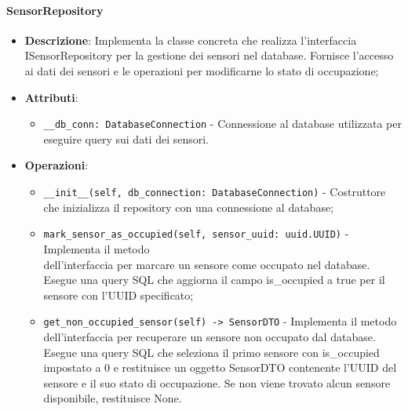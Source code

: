 \documentclass[10pt]{article}
\begin{document}
    \paragraph{SensorRepository}
    \begin{itemize} 
    \item \textbf{Descrizione}: Implementa la classe concreta che realizza l'interfaccia ISensorRepository per la gestione dei sensori nel database. Fornisce l'accesso ai dati dei sensori e le operazioni per modificarne lo stato di occupazione;
    \item \textbf{Attributi}:
    \begin{itemize}
        \item \texttt{\_\_db\_conn: DatabaseConnection} - Connessione al database utilizzata per eseguire query sui dati dei sensori.
    \end{itemize}
    
    \item \textbf{Operazioni}:
    \begin{itemize}
        \item \texttt{\_\_init\_\_(self, db\_connection: DatabaseConnection)} - Costruttore che inizializza il repository con una connessione al database;
        
        \item \texttt{mark\_sensor\_as\_occupied(self, sensor\_uuid: uuid.UUID)} - Implementa il metodo\\ dell'interfaccia per marcare un sensore come occupato nel database. Esegue una query SQL che aggiorna il campo is\_occupied a true per il sensore con l'UUID specificato;
        
        \item \texttt{get\_non\_occupied\_sensor(self) -> SensorDTO} - Implementa il metodo dell'interfaccia per recuperare un sensore non occupato dal database. Esegue una query SQL che seleziona il primo sensore con is\_occupied impostato a 0 e restituisce un oggetto SensorDTO contenente l'UUID del sensore e il suo stato di occupazione. Se non viene trovato alcun sensore disponibile, restituisce None.
    \end{itemize}
    \end{itemize}
\end{document}
